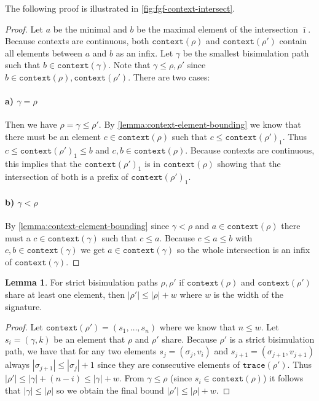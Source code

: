 \documentclass[draft]{scrartcl}
\theoremstyle{definition}
\newtheorem{lemma}[theorem]{Lemma}
\newcommand{\trace}[1]{\mathtt{trace}(#1)}
\newcommand{\context}[1]{\mathtt{context}(#1)}
\begin{document}
The following proof is illustrated in \cref{fig:fgf-context-intersect}.
\begin{proof}
  Let $a$ be the minimal and $b$ be the maximal element of the intersection $\bar{\imath}$.
  Because contexts are continuous, both $\context{\rho}$ and $\context{\rho'}$ contain all elements between $a$ and $b$ as an infix.
  Let $\gamma$ be the smallest bisimulation path such that $b \in \context{\gamma}$.
  Note that $\gamma \le \rho, \rho'$ since $b \in \context{\rho}, \context{\rho'}$.
  There are two cases:

  \paragraph{a) $\gamma = \rho$}
  Then we have $\rho = \gamma \le \rho'$.
  By \cref{lemma:context-element-bounding} we know that there must be an element $c \in \context{\rho}$ such that $c \le \context{\rho'}_{1}$.
  Thus $c \le \context{\rho'}_{1} \le b$ and $c, b \in \context{\rho}$.
  Because contexts are continuous, this implies that the $\context{\rho'}_{1}$ is in $\context{\rho}$ showing that the intersection of both is a prefix of $\context{\rho'}_{1}$.

  \paragraph{b) $\gamma < \rho$}
  By \cref{lemma:context-element-bounding} since $\gamma < \rho$ and $a \in \context{\rho}$ there must a $c \in \context{\gamma}$ such that $c \le a$.
  Because $c \le a \le b$ with $c, b \in \context{\gamma}$ we get $a \in \context{\gamma}$ so the whole intersection is an infix of $\context{\gamma}$.
\end{proof}

\begin{lemma}\label{lemma:fgf-context-path-length}
  For strict bisimulation paths $\rho, \rho'$ if $\context{\rho}$ and $\context{\rho'}$ share at least one element, then $|\rho'| \le |\rho| + w$ where $w$ is the width of the signature.
\end{lemma}
\begin{proof}
  Let $\context{\rho'} = (s_{1}, \ldots, s_{n})$ where we know that $n \le w$.
  Let $s_{i} = (\gamma, k)$ be an element that $\rho$ and $\rho'$ share.
  Because $\rho'$ is a strict bisimulation path, we have that for any two elements $s_{j} = (\sigma_{j}, v_{i})$ and $s_{j+1} = (\sigma_{j+1}, v_{j+1})$ always $|\sigma_{j+1}| \le |\sigma_{j}| + 1$ since they are consecutive elements of $\trace{\rho'}$.
  Thus $|\rho'| \le |\gamma| + (n - i) \le |\gamma| + w$.
  From $\gamma \le \rho$ (since $s_{i} \in \context{\rho}$) it follows that $|\gamma| \le |\rho|$ so we obtain the final bound $|\rho'| \le |\rho| + w$.
\end{proof}
\end{document}
